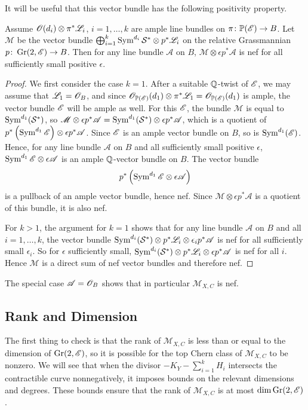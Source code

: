 It will be useful that this vector bundle has the following positivity property.
\begin{lemma}
  \label{lem:NefPerturbation}
  Assume $\mathscr{O}(d_i) \otimes \pi^*\mathscr{L}_i$, $i=1,\dots,k$ are ample line bundles on $\pi \colon \mathbb{P}(\mathscr{E}) \to B$. Let $\mathscr{M}$ be the vector bundle $\bigoplus_{i=1}^k \operatorname{Sym}^{d_i} \mathcal{S}^* \otimes p^*\mathscr{L}_i$ on the relative Grassmannian $p \colon \operatorname{Gr}(2,\mathscr{E}) \to B$. Then for any line bundle $\mathscr{A}$ on $B$,  $\mathscr{M} \otimes \epsilon p^* \mathscr{A}$ is nef for all sufficiently small positive $\epsilon$.
\end{lemma}
\begin{proof}
  We first consider the case $k=1$. After a suitable $\mathbb{Q}$-twist of $\mathscr{E}$, we may assume that $\mathscr{L}_1 = \mathscr{O}_B$, and since $\mathscr{O}_{\mathbb{P}(\mathscr{E})}(d_1) \otimes \pi^*\mathscr{L}_1 = \mathscr{O}_{\mathbb{P}(\mathscr{E})}(d_1)$ is ample, the vector bundle $\mathscr{E}$ will be ample as well. For this $\mathscr{E}$, the bundle $\mathscr{M}$ is equal to $\operatorname{Sym}^{d_1}(\mathcal{S}^*)$, so $\mathscr{M} \otimes \epsilon p^*\mathscr{A} = \operatorname{Sym}^{d_1}(\mathcal{S}^*) \otimes \epsilon p^*\mathscr{A}$, which is a quotient of $p^*\left(\operatorname{Sym}^{d_1}\mathscr{E}\right) \otimes \epsilon p^*\mathscr{A}$. Since $\mathscr{E}$ is an ample vector bundle on $B$, so is $\operatorname{Sym}^{d_1}(\mathscr{E})$. Hence, for any line bundle $\mathscr{A}$ on $B$ and all sufficiently small positive $\epsilon$, $\operatorname{Sym}^{d_1}\mathscr{E} \otimes \epsilon \mathscr{A}$ is an ample $\mathbb{Q}$-vector bundle on $B$. The vector bundle 
\[p^* \left( \operatorname{Sym}^{d_1}\mathscr{E} \otimes \epsilon \mathscr{A} \right)\]
is a pullback of an ample vector bundle, hence nef. Since $\mathscr{M} \otimes \epsilon p^*\mathscr{A}$ is a quotient of this bundle, it is also nef.

For $k > 1$, the argument for $k=1$ shows that for any line bundle $\mathscr{A}$ on $B$ and all $i = 1,\dots,k$, the vector bundle $\operatorname{Sym}^{d_i}(\mathcal{S}^*) \otimes p^*\mathscr{L}_i \otimes \epsilon_i p^* \mathscr{A}$ is nef for all sufficiently small $\epsilon_i$. So for $\epsilon$ sufficiently small, $\operatorname{Sym}^{d_i}(\mathcal{S}^*) \otimes p^*\mathscr{L}_i \otimes \epsilon p^* \mathscr{A}$ is nef for all $i$. Hence $\mathscr{M}$ is a direct sum of nef vector bundles and therefore nef.
\end{proof}
The special case $\mathscr{A} = \mathscr{O}_B$ shows that in particular $\mathscr{M}_{X,C}$ is nef.


\subsection{Rank and Dimension}
The first thing to check is that the rank of $\mathscr{M}_{X,C}$ is less than or equal to the dimension of $\operatorname{Gr}(2,\mathscr{E})$, so it is possible for the top Chern class of $\mathscr{M}_{X,C}$ to be nonzero. We will see that when the divisor $-K_Y - \sum_{i=1}^k H_i$ intersects the contractible curve nonnegatively, it imposes bounds on the relevant dimensions and degrees. These bounds ensure that the rank of $\mathscr{M}_{X,C}$ is at most $\dim \operatorname{Gr}(2,\mathscr{E})$.

